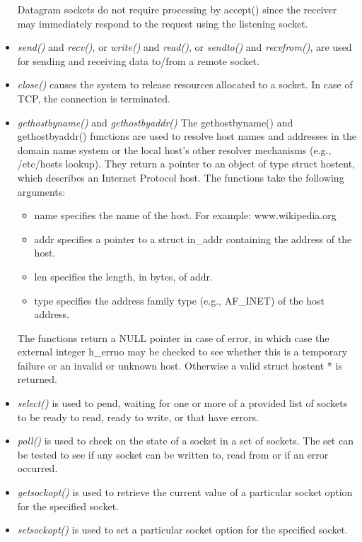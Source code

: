 \begin{itemize}
Datagram sockets do not require processing by accept() since the receiver may immediately respond to the request using the listening socket.
	\item \textit{send()} and \textit{recv()}, or \textit{write()} and \textit{read()}, or \textit{sendto()} and \textit{recvfrom()}, are used for sending and receiving data to/from a remote socket.
	\item \textit{close()} causes the system to release resources allocated to a socket. In case of TCP, the connection is terminated.
	\item \textit{gethostbyname()} and \textit{gethostbyaddr()} The gethostbyname() and gethostbyaddr() functions are used to resolve host names and addresses in the domain name system or the local host's other resolver mechanisms (e.g., /etc/hosts lookup). They return a pointer to an object of type struct hostent, which describes an Internet Protocol host. The functions take the following arguments:
		\begin{itemize}
			\item name specifies the name of the host. For example: www.wikipedia.org
			\item addr specifies a pointer to a struct in\_addr containing the address of the host.
			\item len specifies the length, in bytes, of addr.
			\item type specifies the address family type (e.g., AF\_INET) of the host address.
		\end{itemize}
The functions return a NULL pointer in case of error, in which case the external integer h\_errno may be checked to see whether this is a temporary failure or an invalid or unknown host. Otherwise a valid struct hostent * is returned.
	\item \textit{select()} is used to pend, waiting for one or more of a provided list of sockets to be ready to read, ready to write, or that have errors.
	\item \textit{poll()} is used to check on the state of a socket in a set of sockets. The set can be tested to see if any socket can be written to, read from or if an error occurred.
	\item \textit{getsockopt()} is used to retrieve the current value of a particular socket option for the specified socket.
	\item \textit{setsockopt()} is used to set a particular socket option for the specified socket.
\end{itemize}